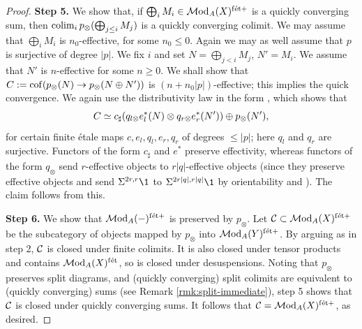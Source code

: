 \documentclass{amsart}
\numberwithin{proposition}{section}
\numberwithin{equation}{section}
\def\fet{\mathrm{f\acute et}}
\begin{document}
\begin{proof}
\textbf{Step 5.} We show that, if $\bigoplus_i M_i \in \Mod_A(X)^{\fet+}$ is a quickly converging sum, then $\operatorname*{colim}_i p_\otimes(\bigoplus_{j \le i} M_j)$ is a quickly converging colimit.
We may assume that $\bigoplus_i M_i$ is $n_0$-effective, for some $n_0 \le 0$.
Again we may as well assume that $p$ is surjective of degree $|p|$.
We fix $i$ and set $N = \bigoplus_{j < i} M_j$, $N' = M_i$.
We assume that $N'$ is $n$-effective for some $n \ge 0$.
We shall show that $C := \operatorname{cof}(p_\otimes(N) \to p_\otimes(N \oplus N'))$ is $(n+n_0|p|)$-effective; this implies the quick convergence.
We again use the distributivity law in the form \cite[Corollary 5.13]{bachmann-norms}, which shows that \[ C \simeq c_\sharp(q_{l\otimes}e_l^*(N) \otimes q_{r\otimes}e_r^*(N')) \oplus p_\otimes(N'), \] for certain finite étale maps $c, e_l, q_l, e_r, q_r$ of degrees $\le |p|$; here $q_l$ and $q_r$ are surjective.
Functors of the form $c_\sharp$ and $e^*$ preserve effectivity, whereas functors of the form $q_\otimes$ send $r$-effective objects to $r|q|$-effective objects (since they preserve effective objects and send $\Sigma^{2r,r}\1$ to $\Sigma^{2r|q|,r|q|}\1$ by orientability and \cite[Remark 4.9]{bachmann-norms}).
The claim follows from this.

\textbf{Step 6.} We show that $\Mod_A(\ph)^{\fet+}$ is preserved by $p_\otimes$.
Let $\scr C \subset \Mod_A(X)^{\fet+}$ be the subcategory of objects mapped by $p_\otimes$ into $\Mod_A(Y)^{\fet+}$.
By arguing as in step 2, $\mathcal C$ is closed under finite colimits.
It is also closed under tensor products and contains $\Mod_A(X)^{\fet}$, so is closed under desuspensions.
Noting that $p_\otimes$ preserves split diagrams, and (quickly converging) split colimits are equivalent to (quickly converging) sums (see Remark \ref{rmk:split-immediate}), step 5 shows that $\mathcal C$ is closed under quickly converging sums.
It follows that $\scr C = \Mod_A(X)^{\fet+}$, as desired.


\end{proof}
\end{document}
